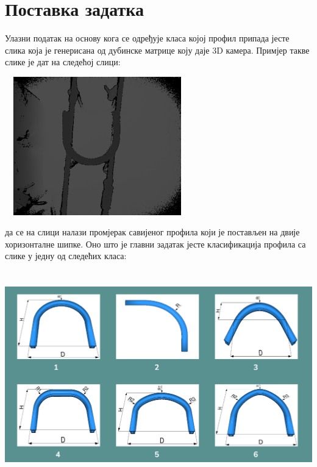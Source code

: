 \documentclass[12pt]{article}
\begin{document}
\newpage

\section{Поставка задатка}
Улазни податак на основу кога се одређује класа којој профил припада јесте слика која је генерисана од дубинске матрице коју даје 3D камера. Примјер такве слике је дат на следећој слици:
\vspace{0.5cm}
\begin{center}
    \centering 
    \includegraphics[height=6cm, width=8cm]{images/ulazna_slika.png}
\end{center}
\vspace{0.5cm}
\indent{} да се на слици налази промјерак савијеног профила који је постављен на двије хоризонталне шипке. Оно што је главни задатак јесте класификација профила са слике у једну од следећих класа:
\vspace{0.5cm}
\begin{center}
    \centering 
    \includegraphics[height=9cm, width=15cm]{images/klase.png}
\end{center}
\end{document}
